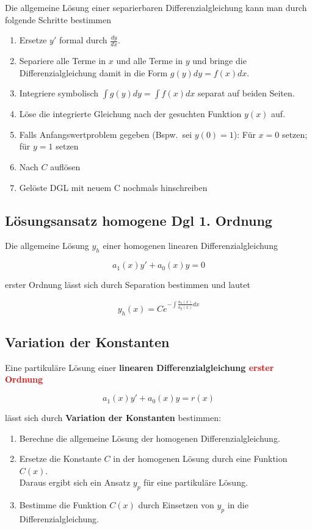 \documentclass[12pt, a4paper]{scrreprt}
\begin{document}
Die allgemeine Lösung einer separierbaren Differenzialgleichung kann man durch folgende Schritte bestimmen
\begin{enumerate}
\item Ersetze \(y'\) formal durch \(\frac{dy}{dx}\).
\item Separiere alle Terme in \(x\) und alle Terme in \(y\) und bringe die Differenzialgleichung damit in die Form \(g(y)dy=f(x)dx\).
\item Integriere symbolisch \(\int{g(y)dy} = \int{f(x)dx}\) separat auf beiden Seiten.
\item Löse die integrierte Gleichung nach der gesuchten Funktion \(y(x)\) auf.
\item Falls Anfangswertproblem gegeben (Bspw.\ sei \(y(0) = 1\)): Für \(x = 0\) setzen; für \(y = 1\) setzen
\item Nach \(C\) auflösen
\item Gelöste DGL mit neuem C nochmals hinschreiben
\end{enumerate}

\subsection{Lösungsansatz homogene Dgl 1. Ordnung}

Die allgemeine Lösung \(y_h\) einer homogenen linearen Differenzialgleichung

\[
  a_1(x)y'+a_0(x)y=0
\]

erster Ordnung lässt sich durch Separation bestimmen und lautet

\[
  y_h(x)=Ce^{-\int{\frac{a_o(x)}{a_y(x)}dx}}
\]

\subsection{Variation der Konstanten}

Eine partikuläre Lösung einer \textbf{linearen Differenzialgleichung \textcolor{red}{erster Ordnung}}

\[
  a_1(x)y'+a_0(x)y=r(x)
\]

lässt sich durch \textbf{Variation der Konstanten} bestimmen:

\begin{enumerate}
\item Berechne die allgemeine Lösung der homogenen Differenzialgleichung.
\item Ersetze die Konstante \(C\) in der homogenen Lösung durch eine Funktion \(C(x)\).\\
  Daraus ergibt sich ein Ansatz \(y_p\) für eine partikuläre Lösung.
\item Bestimme die Funktion \(C(x)\) durch Einsetzen von \(y_p\) in die Differenzialgleichung.
\end{enumerate}
\end{document}
